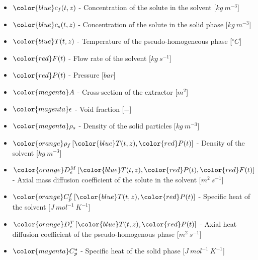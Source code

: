 \documentclass[17pt, a0paper, portrait, margin=10mm, innermargin=15mm, blockverticalspace=15mm, colspace=15mm, subcolspace=8mm]{tikzposter}
\begin{document}
\begin{columns}
{			\begin{multicols}{2}
				\begin{itemize}
					\item[] ${\color{blue}c_f}(t,z)$ - Concentration of the solute in the solvent [$kg~m^{-3}$]
					\item[] ${\color{blue}c_s}(t,z)$ - Concentration of the solute in the solid phase [$kg~m^{-3}$]
					\item[] ${\color{blue}T}(t,z)$ - Temperature of the pseudo-homogeneous phase [$^\circ C$]
					\item[] ${\color{red}F}(t)$ - Flow rate of the solvent [$kg~s^{-1}$]
					\item[] ${\color{red}P}(t)$ - Pressure [$bar$]
					\item[] ${\color{magenta}A}$ - Cross-section of the extractor [$m^2$]
					\item[] ${\color{magenta}\epsilon}$ - Void fraction [$-$]
					\item[] ${\color{magenta}\rho_s}$ - Density of the solid particles [$kg~m^{-3}$]
					\item[] ${\color{orange}\rho_f}\left[{\color{blue}T}(t,z),{\color{red}P}(t)\right]$ - Density of the solvent [$kg~m^{-3}$]
					\item[] ${\color{orange}D^M_e}\left[{\color{blue}T}(t,z),{\color{red}P}(t),{\color{red}F}(t)\right]$ - Axial mass diffusion coefficient of the solute in the solvent [$m^2 ~ s^{-1}$]
					\item[] ${\color{orange}C_p^f}\left[{\color{blue}T}(t,z),{\color{red}P}(t)\right]$ - Specific heat of the solvent [$J~mol^{-1}~K^{-1}$]
					\item[] ${\color{orange}D_e^T}\left[{\color{blue}T}(t,z),{\color{red}P}(t)\right]$ - Axial heat diffusion coefficient of the pseudo-homogenous phase [$m^2 ~ s^{-1}$]
					\item[] ${\color{magenta}C_p^s}$ - Specific heat of the solid phase [$J ~ mol^{-1} ~ K^{-1}$]
				\end{itemize}
			\end{multicols}
		
		\vspace{1.0cm}
		\hrule
		\vspace{1.5cm}
		
		
}
\end{columns}
\end{document}
